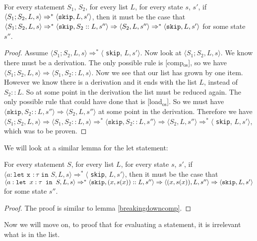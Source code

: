 \begin{lemma}
\label{breakingdowncomp}
For every statement $S_1$, $S_2$, for every list $L$, for every state $s$, $s'$, if $\langle S_1; S_2, L, s \rangle \Rightarrow ^{*} \langle \texttt{skip}, L, s' \rangle$, then it must be the case that $\langle S_1;S_2, L, s \rangle \Rightarrow ^{*} \langle \texttt{skip}, S_2::L, s'' \rangle \Rightarrow \langle S_2, L, s'' \rangle \Rightarrow ^{*} \langle \texttt{skip}, L, s' \rangle$ for some state $s''$. 
\end{lemma}

\begin{proof}
Assume $\langle S_1; S_2, L, s \rangle \Rightarrow ^{*} \langle$ \texttt{skip}, $L, s' \rangle$. Now look at $\langle S_1; S_2, L, s \rangle$. We know there must be a derivation. The only possible rule is [comp$_{\textrm{os}}$], so we have $\langle S_1; S_2, L, s \rangle \Rightarrow \langle S_1, S_2::L, s \rangle$. Now we see that our list has grown by one item. However we know there is a derivation and it ends with the list $L$, instead of $S_2::L$. So at some point in the derivation the list must be reduced again. The only possible rule that could have done that is [load$_{\textrm{os}}$]. So we must have $\langle \texttt{skip} , S_2::L, s'' \rangle \Rightarrow \langle S_2, L, s'' \rangle$ at some point in the derivation. Therefore we have $\langle S_1; S_2, L, s \rangle \Rightarrow \langle S_1, S_2::L, s \rangle \Rightarrow ^{*} \langle \texttt{skip} , S_2::L, s'' \rangle \Rightarrow \langle S_2, L, s'' \rangle \Rightarrow ^{*} \langle$ \texttt{skip}, $L, s' \rangle$, which was to be proven.
\end{proof}

We will look at a similar lemma for the let statement:

\begin{lemma}
\label{breakingdownlet}
For every statement $S$, for every list $L$, for every state $s$, $s'$, if $\langle a : \texttt{let x } : \tau \texttt{ in } S , L, s \rangle \Rightarrow ^{*} \langle$ \texttt{skip}, $L, s' \rangle$, then it must be the case that $\langle a : \texttt{let }x : \tau \texttt{ in } S, L, s \rangle \Rightarrow ^{*} \langle \texttt{skip}, (x,s(x))::L, s'' \rangle \Rightarrow \langle (x,s(x)), L, s'' \rangle \Rightarrow \langle \texttt{skip}, L, s' \rangle$ for some state $s''$. 
\end{lemma}

\begin{proof}
The proof is similar to lemma \ref{breakingdowncomp}. 
\end{proof}

Now we will move on, to proof that for evaluating a statement, it is irrelevant what is in the list. 

